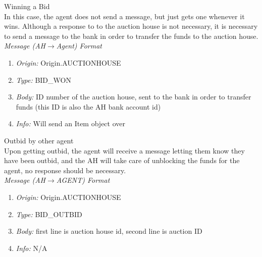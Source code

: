 \documentclass{article}
\begin{document}
\clearpage


\large
Winning a Bid 
\normalsize
\\ In this case, the agent does not send a message, but just gets one whenever it wins. Although a response to to the auction house is not necessary, it is necessary to send a message to the bank in order to transfer the funds to the auction house. 
\footnotesize
\\\emph{Message (AH$\to$Agent) Format} 
\begin{enumerate} 
	\item[]\emph{Origin:} Origin.AUCTIONHOUSE
	\item[]\emph{Type:} BID\_WON
	\item[]\emph{Body:} ID number of the auction house, sent to the bank in order to transfer funds (this ID is also the AH bank account id) 
	\item[]\emph{Info:} Will send an Item object over 
\end{enumerate}

\vspace{1cm} 

\large
Outbid by other agent 
\normalsize
\\Upon getting outbid, the agent will receive a message letting them know they have been outbid, and the AH will take care of unblocking the funds for the agent, no response should be necessary. 
\footnotesize
\\\emph{Message (AH$\to$AGENT) Format} 
\begin{enumerate}
	\item[]\emph{Origin:} Origin.AUCTIONHOUSE
	\item[]\emph{Type:} BID\_OUTBID 
	\item[]\emph{Body:} first line is auction house id, second line is auction ID
	\item[]\emph{Info:} N/A 
\end{enumerate}
\end{document}
